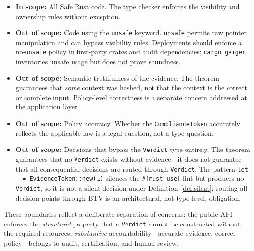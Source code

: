 \begin{itemize}
  \item \textbf{In scope:} All Safe Rust code.  The type checker
    enforces the visibility and ownership rules without exception.
  \item \textbf{Out of scope:} Code using the \texttt{unsafe}
    keyword.  \texttt{unsafe} permits raw pointer manipulation and
    can bypass visibility rules.  Deployments should enforce a
    no-\texttt{unsafe} policy in first-party crates and audit dependencies;
    \texttt{cargo geiger} inventories unsafe usage but does not prove soundness.
  \item \textbf{Out of scope:} Semantic truthfulness of the evidence.
    The theorem guarantees that \emph{some} context was hashed, not
    that the context is the correct or complete input.  Policy-level
    correctness is a separate concern addressed at the application layer.
  \item \textbf{Out of scope:} Policy accuracy.  Whether the
    \texttt{ComplianceToken} accurately reflects the applicable law
    is a legal question, not a type question.
  \item \textbf{Out of scope:} Decisions that bypass the
    \texttt{Verdict} type entirely.  The theorem guarantees that no
    \texttt{Verdict} exists without evidence---it does not guarantee
    that all consequential decisions are routed through
    \texttt{Verdict}.  The pattern \texttt{let \_ =
    EvidenceToken::new(\ldots)} silences the \texttt{\#[must\_use]}
    lint but produces no \texttt{Verdict}, so it is not a silent
    decision under Definition~\ref{def:silent}; routing all decision
    points through BTV is an architectural, not type-level,
    obligation.
\end{itemize}

These boundaries reflect a deliberate separation of concerns: the
public API enforces the \emph{structural} property that a
\texttt{Verdict} cannot be constructed without the required resources;
\emph{substantive} accountability---accurate evidence, correct
policy---belongs to audit, certification, and human review.
